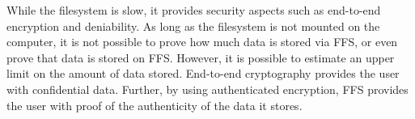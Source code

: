 While the filesystem is slow, it provides security aspects such as \mbox{end-to-end} encryption and deniability. As long as the filesystem is not mounted on the computer, it is not possible to prove how much data is stored via \gls{FFS}, or even prove that data is stored on \gls{FFS}. However, it is possible to estimate an upper limit on the amount of data stored. \mbox{End-to-end} cryptography provides the user with confidential data. Further, by using authenticated encryption, \gls{FFS} provides the user with proof of the authenticity of the data it stores. 

